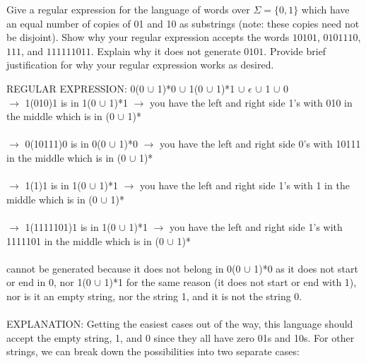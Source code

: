 \documentclass[11pt]{article}
\theoremstyle{definition}
\theoremstyle{theorem}
\newcommand{\solution}{\medskip\noindent{\color{blue}\textbf{Solution:}}}
\begin{document}
Give a regular expression for the language of words over $\Sigma = \{0, 1\}$ which have an equal number of copies of 01 and 10 as substrings (note: these copies need not be disjoint). Show why your regular expression accepts the words $10101$, $0101110$, $111$, and $111111011$. Explain why it does not generate $0101$. Provide brief justification for why your regular expression works as desired.

\solution

\noindent REGULAR EXPRESSION: 0(0 $\cup$ 1)*0 $\cup$ 1(0 $\cup$ 1)*1 $\cup$ $ \epsilon $ $\cup$ 1 $\cup$ 0 \\

 $\rightarrow$ 1(010)1 is in 1(0 $\cup$ 1)*1 $\rightarrow$ you have the left and right side 1's with 010 in the middle which is in (0 $\cup$ 1)* \\~\\
 $\rightarrow$ 0(10111)0 is in 0(0 $\cup$ 1)*0  $\rightarrow$ you have the left and right side 0's with 10111 in the middle which is in (0 $\cup$ 1)* \\~\\
 $\rightarrow$ 1(1)1 is in 1(0 $\cup$ 1)*1  $\rightarrow$ you have the left and right side 1's with 1 in the middle which is in (0 $\cup$ 1)* \\~\\
 $\rightarrow$ 1(1111101)1 is in 1(0 $\cup$ 1)*1  $\rightarrow$ you have the left and right side 1's with 1111101 in the middle which is in (0 $\cup$ 1)* \\~\\
 cannot be generated because it does not belong in 0(0 $\cup$ 1)*0 as it does not start or end in 0, nor 1(0 $\cup$ 1)*1 for the same reason (it does not start or end with 1), nor is it an empty string, nor the string 1, and it is not the string 0.   \\~\\

\noindent EXPLANATION: Getting the easiest cases out of the way, this language should accept the empty string, 1, and 0 since they all have zero 01s and 10s.
\noindent For other strings, we can break down the possibilities into two separate cases: \\ ~ \\
\end{document}
